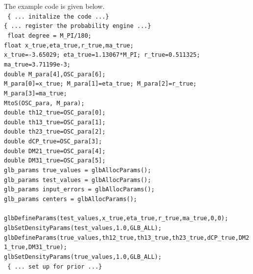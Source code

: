 \documentclass[a4paper,11pt]{article}
\begin{document}
The example code is given below.\vspace{0.2cm}\\
\texttt{ \{ ...  initalize the code ...\}\\
\{ ...  register the probability engine ...\}    }\vspace{0.2cm}\\
\texttt{    
    float degree   = M\_PI/180;\\
    float x\_true,eta\_true,r\_true,ma\_true;\\
    x\_true=-3.65029; eta\_true=1.13067*M\_PI; r\_true=0.511325; ma\_true=3.71199e-3;\\
    double M\_para[4],OSC\_para[6];\\
    M\_para[0]=x\_true; M\_para[1]=eta\_true; M\_para[2]=r\_true; M\_para[3]=ma\_true;\\
    MtoS(OSC\_para, M\_para);\\
    double th12\_true=OSC\_para[0];\\
    double th13\_true=OSC\_para[1];\\
    double th23\_true=OSC\_para[2];\\
    double dCP\_true=OSC\_para[3];\\
    double DM21\_true=OSC\_para[4];\\
    double DM31\_true=OSC\_para[5];\\
    glb\_params true\_values = glbAllocParams();\\
    glb\_params test\_values = glbAllocParams();\\
    glb\_params input\_errors = glbAllocParams();\\
    glb\_params centers = glbAllocParams();\\
    \\
    glbDefineParams(test\_values,x\_true,eta\_true,r\_true,ma\_true,0,0);\\
    glbSetDensityParams(test\_values,1.0,GLB\_ALL);\\
    glbDefineParams(true\_values,th12\_true,th13\_true,th23\_true,dCP\_true,DM21\_true,DM31\_true);\\
    glbSetDensityParams(true\_values,1.0,GLB\_ALL); }\vspace{0.2cm}\\
\texttt{ \{ ...  set up for prior ...\}}\vspace{0.2cm}\\
\end{document}
